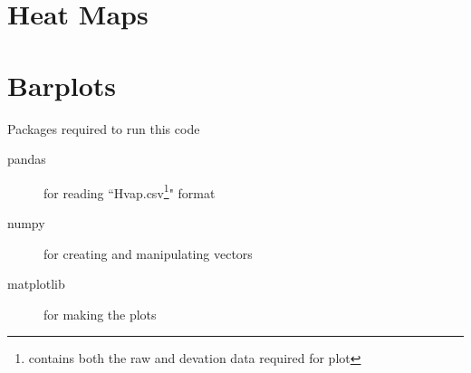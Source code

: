 \documentclass[oneside,11pt]{memoir} %
\begin{document}

\chapter{Heat Maps}




\chapter{Barplots}
Packages required to run this code
\begin{description}
  \item[pandas] for reading ``Hvap.csv\footnote{contains both the raw and devation data required for plot}" format
  \item[numpy] for creating and manipulating vectors
  \item[matplotlib] for making the plots
\end{description}
\end{document}
